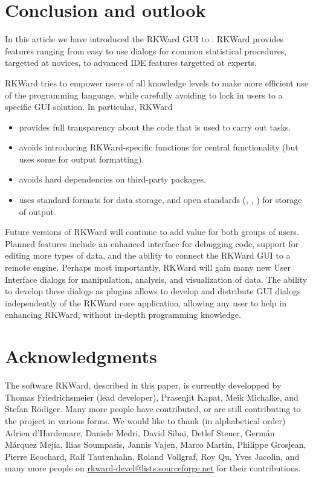 \section{Conclusion and outlook}
\label{sec:conclusion_summary}
In this article we have introduced the RKWard GUI to . RKWard provides features ranging
from easy to use dialogs for common statistical procedures, targetted at  novices, to advanced
IDE features targetted at  experts.

RKWard tries to empower users of all knowledge levels to make more efficient use of the 
 programming language, while carefully avoiding to lock in users to a specific
GUI solution. In particular, RKWard
\begin{itemize}
 \item provides full transparency about the  code that is used to carry out tasks.
 \item avoids introducing RKWard-specific  functions for central functionality (but uses some for output formatting).
 \item avoids hard dependencies on third-party  packages.
 \item uses standard  formats \citep[cf.][]{RDCT2010c} for data storage, and open standards (, , ) for storage of output.
\end{itemize}

Future versions of RKWard will continue to add value for both groups of users. Planned features include
an enhanced interface for debugging  code, support for editing more types of data, and the
ability to connect the RKWard GUI to a remote  engine. Perhaps most importantly, RKWard will
gain many new User Interface dialogs for manipulation, analysis, and visualization of data. The ability to
develop these dialogs as plugins allows to develop and distribute GUI dialogs
independently of the RKWard core application, allowing any user to help in enhancing RKWard, without in-depth
programming knowledge.

\section{Acknowledgments}
\label{sec:acknowledgments}
The software RKWard, described in this paper, is currently developped by Thomas Friedrichsmeier (lead developer), Prasenjit Kapat, Meik Michalke,
and Stefan R\"odiger. Many more people have contributed, or are still contributing to the project in various forms. We would like to
thank (in alphabetical order) Adrien d'Hardemare, Daniele Medri, David Sibai, Detlef Steuer, Germ\'an M\'arquez Mej\'ia,
Ilias Soumpasis, Jannis Vajen, Marco Martin, Philippe Grosjean, Pierre Ecochard, Ralf Tautenhahn, Roland Vollgraf, Roy Qu,
Yves Jacolin, and many more people on \url{rkward-devel@lists.sourceforge.net} for their contributions.


